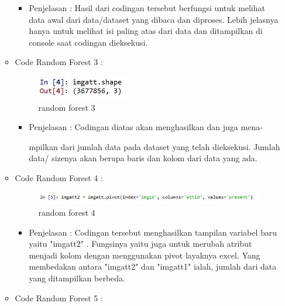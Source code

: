\begin{enumerate}
\begin{itemize}
\begin{itemize}
\item Penjelasan : Hasil dari codingan tersebut berfungsi untuk melihat data awal dari data/dataset yang dibaca dan diproses. Lebih jelasnya hanya untuk melihat isi paling atas dari data dan ditampilkan di console saat codingan dieksekusi.
\par
\par
\end{itemize}
\item Code Random Forest 3 :
\par
\begin{figure}[ht]
\centering
\includegraphics[scale=0.4]{figures/ran3.jpg}
\caption{random forest 3}
\label{contoh}
\end{figure}
\par
\begin{itemize}
\item Penjelasan : Codingan diatas akan menghasilkan dan juga mena-
\par mpilkan dari jumlah data pada dataset yang telah dieksekusi. Jumlah data/ sizenya akan berupa baris dan kolom dari data yang ada.
\par
\par
\end{itemize}
\item Code Random Forest 4 :
\par
\begin{figure}[ht]
\centering
\includegraphics[scale=0.2]{figures/ran4.jpg}
\caption{random forest 4}
\label{contoh}
\end{figure}
\par
\begin{itemize}
\item Penjelasan : Codingan tersebut menghasilkan tampilan variabel baru yaitu "imgatt2" . Fungsinya yaitu juga untuk merubah atribut menjadi kolom dengan menggunakan pivot layaknya excel. Yang membedakan antara "imgatt2" dan "imgatt1" ialah, jumlah dari data yang ditampilkan berbeda.
\par
\par
\end{itemize}
\item Code Random Forest 5 :
\par
\par

\end{itemize}
\end{enumerate}
